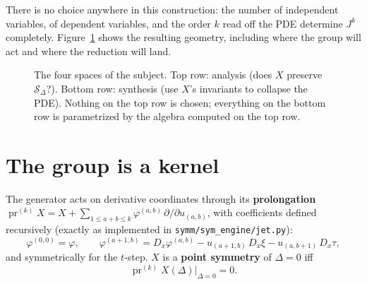 \documentclass[11pt]{article}
\theoremstyle{plain}
\theoremstyle{definition}
\theoremstyle{remark}
\newcommand{\R}{\mathbb{R}}
\newcommand{\pr}{\operatorname{pr}}
\newcommand{\Dx}{D_x}
\begin{document}
There is no choice anywhere in this construction: the number of independent variables, of dependent
variables, and the order $k$ read off the PDE determine $J^k$ completely. Figure~\ref{fig:stage}
shows the resulting geometry, including where the group will act and where the reduction will land.

\begin{figure}[ht]\centering
{}
\caption{The four spaces of the subject. Top row: analysis (does $X$ preserve $\mathcal S_\Delta$?).
Bottom row: synthesis (use $X$'s invariants to collapse the PDE). Nothing on the top row is chosen;
everything on the bottom row is parametrized by the algebra computed on the top row.}
\label{fig:stage}
\end{figure}

\section{The group is a kernel}\label{sec:kernel}

The generator acts on derivative coordinates through its \textbf{prolongation}
$\pr^{(k)}X = X + \sum_{1\le a+b\le k}\varphi^{(a,b)}\,\partial/\partial u_{(a,b)}$, with
coefficients defined recursively (exactly as implemented in \texttt{symm/sym\_engine/jet.py}):
\begin{equation}\label{eq:prolong}
\varphi^{(0,0)}=\varphi,\qquad
\varphi^{(a+1,b)}=\Dx\varphi^{(a,b)}-u_{(a+1,b)}\,\Dx\xi-u_{(a,b+1)}\,\Dx\tau,
\end{equation}
and symmetrically for the $t$-step. $X$ is a \textbf{point symmetry} of $\Delta=0$ iff
\begin{equation}\label{eq:inv}
\pr^{(k)}X(\Delta)\big|_{\Delta=0}=0 .
\end{equation}
\end{document}

